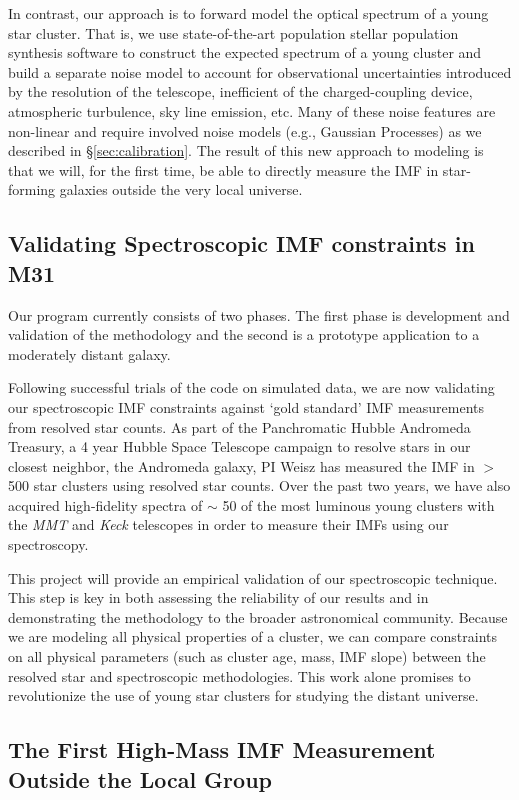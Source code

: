 \documentclass[11pt,preprint]{aastex}
\begin{document}
In contrast, our approach is to forward model the optical spectrum of a young star cluster.  That is, we use state-of-the-art population stellar population synthesis software to construct the expected spectrum of a young cluster and build a separate noise model to account for observational uncertainties introduced by the resolution of the telescope, inefficient of the charged-coupling device, atmospheric turbulence, sky line emission, etc.  Many of these noise features are non-linear and require involved noise models (e.g., Gaussian Processes) as we described in \S \ref{sec:calibration}.  The result of this new approach to modeling is that we will, for the first time, be able to directly measure the IMF in star-forming galaxies outside the very local universe.  

\subsection{Validating Spectroscopic IMF constraints in M31}

Our program currently consists of two phases.  The first phase is development and validation of the methodology and the second is a prototype application to a moderately distant galaxy.

Following successful trials of the code on simulated data, we are now validating our spectroscopic IMF constraints against `gold standard' IMF measurements from resolved star counts.  As part of the Panchromatic Hubble Andromeda Treasury, a 4 year Hubble Space Telescope campaign to resolve stars in our closest neighbor, the Andromeda galaxy, PI Weisz has measured the IMF in $>$500 star clusters using resolved star counts.  Over the past two years, we have also acquired high-fidelity spectra of $\sim$ 50 of the most luminous young clusters with the \textit{MMT} and \textit{Keck} telescopes in order to measure their IMFs using our spectroscopy.  

This project will provide an empirical validation of our spectroscopic technique.  This step is key in both assessing the reliability of our results and in demonstrating the methodology to the broader astronomical community.  Because we are modeling all physical properties of a cluster, we can compare constraints on all physical parameters (such as cluster age, mass, IMF slope) between the resolved star and spectroscopic  methodologies.  This work alone promises to revolutionize the use of young star clusters for studying the distant universe.

\subsection{The First High-Mass IMF Measurement Outside the Local Group}
\end{document}
